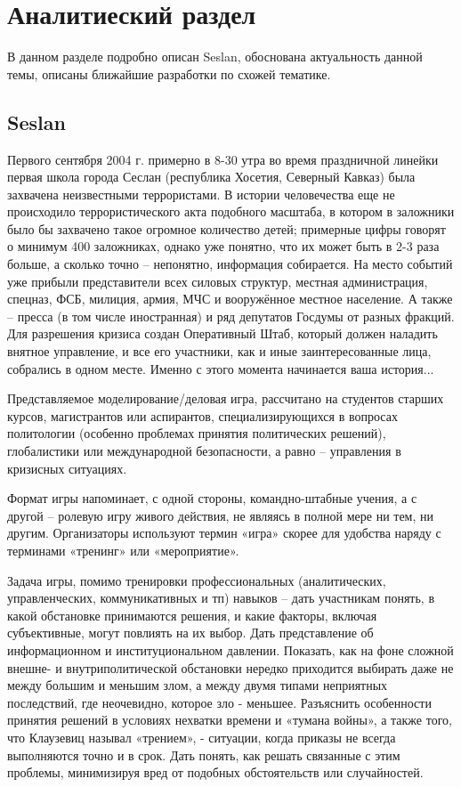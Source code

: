 \section{Аналитиеский раздел}
	
	В данном разделе подробно описан Seslan, обоснована актуальность данной темы, описаны ближайшие разработки по схожей тематике.

\subsection{Seslan}
	Первого сентября 2004 г. примерно в 8-30 утра во время праздничной линейки первая школа города Сеслан  (республика Хосетия, Северный Кавказ) была захвачена неизвестными террористами. 
	В истории человечества еще не происходило террористического акта подобного масштаба, в котором в заложники было бы захвачено такое огромное количество детей; примерные цифры говорят о минимум 400 заложниках, однако уже понятно, что  их может быть в 2-3  раза больше, а сколько точно – непонятно, информация собирается. 
	На место событий уже прибыли представители всех силовых структур, местная администрация, спецназ, ФСБ, милиция,  армия, МЧС и вооружённое местное население. 
	А также – пресса (в том числе иностранная) и ряд депутатов Госдумы от разных фракций. 
	Для разрешения кризиса создан Оперативный Штаб, который должен наладить внятное управление, и все его участники, как и иные заинтересованные лица, собрались в одном месте. Именно с этого момента начинается  ваша история...
	
	Представляемое моделирование/деловая игра, рассчитано на студентов старших курсов, магистрантов или аспирантов, специализирующихся в вопросах политологии (особенно проблемах принятия политических решений), глобалистики или международной безопасности, а равно – управления в кризисных ситуациях.
	
	Формат игры напоминает, с одной стороны, командно-штабные учения, а с другой – ролевую игру живого действия, не являясь в полной мере ни тем, ни другим. Организаторы используют термин «игра» скорее для удобства наряду с терминами «тренинг» или «мероприятие».
	
	Задача игры, помимо тренировки профессиональных (аналитических, управленческих, коммуникативных и тп) навыков – дать участникам  понять, в какой обстановке принимаются решения, и какие факторы, включая субъективные, могут повлиять на их выбор. 
	Дать представление  об информационном и институциональном давлении.  Показать, как  на фоне сложной внешне- и внутриполитической обстановки нередко приходится выбирать даже не между большим и меньшим злом,  а между двумя типами неприятных последствий, где неочевидно, которое зло -  меньшее.  
	Разъяснить особенности принятия решений в условиях нехватки времени и «тумана войны», а также того, что Клаузевиц называл «трением», - ситуации, когда приказы не всегда выполняются точно и в срок. 
	Дать понять, как решать связанные с этим проблемы, минимизируя вред от подобных обстоятельств или случайностей.
	
